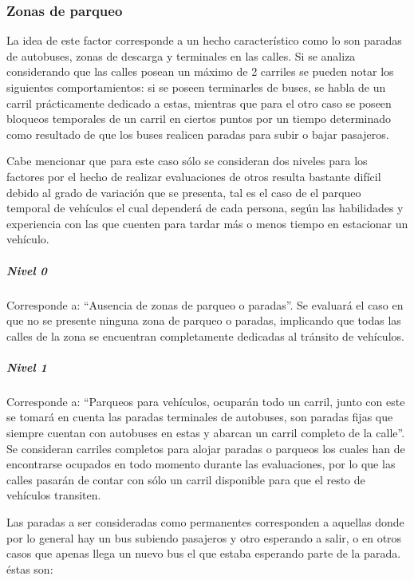 \subsubsection{Zonas de parqueo}
La idea de este  factor corresponde a un hecho caracter\'{i}stico como lo son paradas de autobuses, zonas de descarga y terminales en las calles. Si se analiza considerando que las calles posean un m\'{a}ximo de 2 carriles se pueden notar los siguientes comportamientos: si se poseen terminarles de buses, se habla de un carril pr\'{a}cticamente dedicado a estas, mientras que para el otro caso se poseen bloqueos temporales de un carril en ciertos puntos por un tiempo determinado como resultado de que los buses realicen paradas para subir o bajar pasajeros. 

Cabe mencionar que para este caso s\'{o}lo se consideran dos niveles para los factores por el hecho de realizar evaluaciones de otros resulta bastante dif\'{i}cil debido al grado de variaci\'{o}n que se presenta, tal es el caso de el parqueo temporal de veh\'{i}culos el cual depender\'{a} de cada persona, seg\'{u}n las habilidades y experiencia con las que cuenten para tardar m\'{a}s o menos tiempo en estacionar un veh\'{i}culo. 

\subparagraph{Nivel 0}

Corresponde a: “Ausencia de zonas de parqueo o paradas”. Se evaluar\'{a} el caso en que no se presente ninguna zona de parqueo o paradas, implicando que todas las calles de la zona se encuentran completamente dedicadas al tr\'{a}nsito de veh\'{i}culos.

\subparagraph{Nivel 1}

Corresponde a: “Parqueos para veh\'{i}culos, ocupar\'{a}n todo un carril, junto con este se tomar\'{a} en cuenta las paradas terminales de autobuses, son paradas fijas que siempre cuentan con autobuses en estas y abarcan un carril completo de la calle”. Se consideran carriles completos para alojar paradas o parqueos los cuales han de encontrarse ocupados en todo momento durante las evaluaciones, por lo que las calles pasar\'{a}n de contar con s\'{o}lo un carril disponible para que el resto de veh\'{i}culos transiten.

Las paradas a ser consideradas como permanentes corresponden a aquellas donde por lo general hay un bus subiendo pasajeros y otro esperando a salir, o en otros casos que apenas llega un nuevo bus el que estaba esperando parte de la parada. \'{e}stas son:\newline

